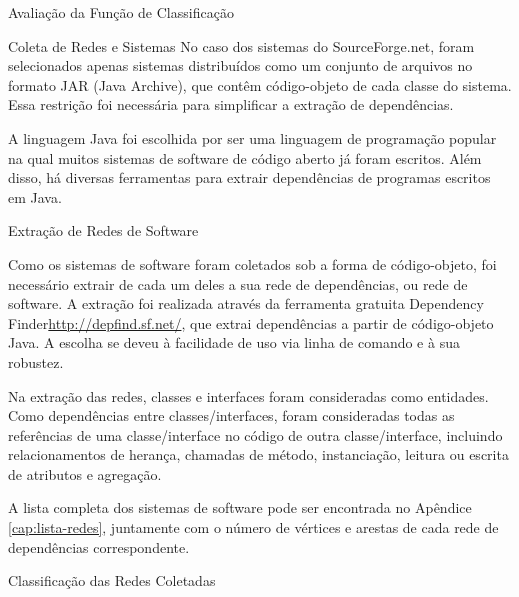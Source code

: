 \begin{section}{Avaliação da Função de Classificação}
\begin{subsection}{Coleta de Redes e Sistemas}
	No caso dos sistemas do SourceForge.net, foram selecionados apenas sistemas distribuídos como um conjunto de arquivos no formato JAR (Java Archive), que contêm código-objeto de cada classe do sistema. Essa restrição foi necessária para simplificar a extração de dependências.

	A linguagem Java foi escolhida por ser uma linguagem de programação popular na qual muitos sistemas de software de código aberto já foram escritos. Além disso, há diversas ferramentas para extrair dependências de programas escritos em Java.

\end{subsection}

\begin{subsection}{Extração de Redes de Software}

	Como os sistemas de software foram coletados sob a forma de código-objeto, foi necessário extrair de cada um deles a sua rede de dependências, ou rede de software. A extração foi realizada através da ferramenta gratuita Dependency Finder\url{http://depfind.sf.net/}, que extrai dependências a partir de código-objeto Java. A escolha se deveu à facilidade de uso via linha de comando e à sua robustez.
	
	Na extração das redes, classes e interfaces foram consideradas como entidades. Como dependências entre classes/interfaces, foram consideradas todas as referências de uma classe/interface no código de outra classe/interface, incluindo relacionamentos de herança, chamadas de método, instanciação, leitura ou escrita de atributos e agregação.

	A lista completa dos sistemas de software pode ser encontrada no Apêndice \ref{cap:lista-redes}, juntamente com o número de vértices e arestas de cada rede de dependências correspondente.

\end{subsection}

\begin{subsection}{Classificação das Redes Coletadas}
	
	
	
	

\end{subsection}
\end{section}
